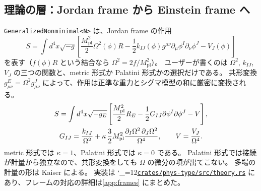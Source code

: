 \documentclass[a4paper,11pt]{ltjsarticle}
\newcommand{\Mpl}{M_{\mathrm{pl}}}
\newcommand{\fnl}{f_{\mathrm{NL}}}
\newcommand{\code}[1]{\texttt{#1}}
\newcommand{\repourl}{https://github.com/inuverse44/phys-type}
\newcommand{\reporev}{b1fea87}
\newcommand{\repo}{\begingroup\catcode`\_=12\relax\repoaux}
\newcommand{\repoaux}[1]{\href{\repourl/blob/\reporev/#1}{\nolinkurl{#1}}\endgroup}
\begin{document}
\begin{center}
\end{center}

\subsection{理論の層：Jordan frame から Einstein frame へ}
\label{sec:theory}

\code{GeneralizedNonminimal<N>} は、Jordan frame の作用
\begin{equation}
S=\int d^4x\sqrt{-g}\left[\frac{\Mpl^2}{2}\Omega^2(\phi)R-\frac12k_{IJ}(\phi)g^{\mu\nu}\partial_\mu\phi^I\partial_\nu\phi^J-V_J(\phi)\right]
\label{eq:jordan}
\end{equation}
を表す（$f(\phi)R$ という結合なら $\Omega^2=2f/\Mpl^2$）。
ユーザーが書くのは $\Omega^2$, $k_{IJ}$, $V_J$ の三つの関数と、metric 形式か Palatini 形式かの選択だけである。
共形変換 $g^E_{\mu\nu}=\Omega^2g^J_{\mu\nu}$ によって、作用は正準な重力とシグマ模型の和に厳密に変換される。
\begin{gather}
S=\int d^4x\sqrt{-g_E}\left[\frac{\Mpl^2}{2}R_E-\frac12G_{IJ}\partial\phi^I\partial\phi^J-V\right],\notag\\
G_{IJ}=\frac{k_{IJ}}{\Omega^2}+\kappa\,\frac32\Mpl^2\frac{\partial_I\Omega^2\,\partial_J\Omega^2}{\Omega^4},\qquad
V=\frac{V_J}{\Omega^4}.
\label{eq:einstein}
\end{gather}
metric 形式では $\kappa=1$、Palatini 形式では $\kappa=0$ である。
Palatini 形式では接続が計量から独立なので、共形変換をしても $\Omega$ の微分の項が出てこない\cite{BauerDemir2008}。
多場の計量の形は Kaiser\cite{Kaiser2010} による。
実装は \repo{crates/phys-type/src/theory.rs} にあり、フレームの対応の詳細は\ref{app:frames} にまとめた。
\end{document}

